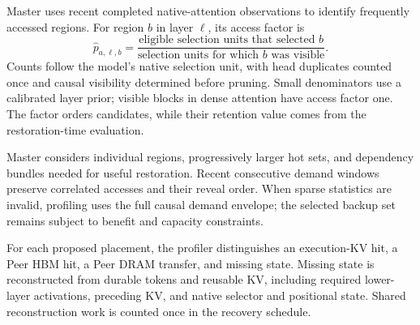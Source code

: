 Master uses recent completed native-attention observations to identify
frequently accessed regions. For region $b$ in layer $\ell$, its access
factor is
\begin{equation}
 \widehat p_{a,\ell,b}=
 \frac{\text{eligible selection units that selected }b}
      {\text{selection units for which }b\text{ was visible}}.
 \label{eq:demand}
\end{equation}
Counts follow the model's native selection unit, with head duplicates
counted once and causal visibility determined before pruning.
Small denominators use a calibrated layer prior; visible blocks in
dense attention have access factor one. The factor orders candidates,
while their retention value comes from the restoration-time evaluation.

Master considers individual regions, progressively larger hot sets,
and dependency bundles needed for useful restoration. Recent consecutive
demand windows preserve correlated accesses and their reveal order.
When sparse statistics are invalid, profiling uses the full causal
demand envelope; the selected backup set remains subject to benefit
and capacity constraints.

For each proposed placement, the profiler distinguishes an execution-KV
hit, a Peer HBM hit, a Peer DRAM transfer, and missing state.
Missing state is reconstructed from durable tokens and reusable KV,
including required lower-layer activations, preceding KV, and native
selector and positional state. Shared reconstruction work is counted
once in the recovery schedule.


